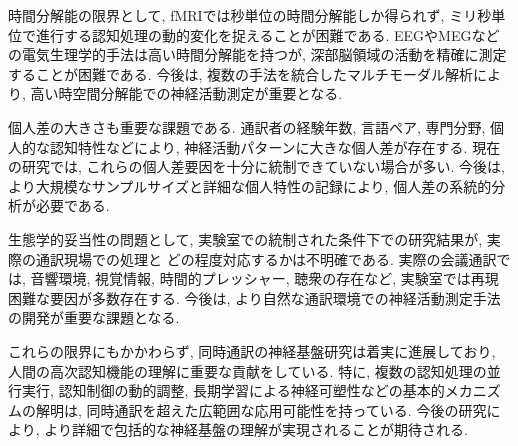 時間分解能の限界として, fMRIでは秒単位の時間分解能しか得られず, ミリ秒単位で進行する認知処理の動的変化を捉えることが困難である.
EEGやMEGなどの電気生理学的手法は高い時間分解能を持つが, 深部脳領域の活動を精確に測定することが困難である.
今後は, 複数の手法を統合したマルチモーダル解析により, 高い時空間分解能での神経活動測定が重要となる.

個人差の大きさも重要な課題である.
通訳者の経験年数, 言語ペア, 専門分野, 個人的な認知特性などにより, 神経活動パターンに大きな個人差が存在する.
現在の研究では, これらの個人差要因を十分に統制できていない場合が多い.
今後は, より大規模なサンプルサイズと詳細な個人特性の記録により, 個人差の系統的分析が必要である.

生態学的妥当性の問題として, 実験室での統制された条件下での研究結果が, 実際の通訳現場での処理と どの程度対応するかは不明確である.
実際の会議通訳では, 音響環境, 視覚情報, 時間的プレッシャー, 聴衆の存在など, 実験室では再現困難な要因が多数存在する.
今後は, より自然な通訳環境での神経活動測定手法の開発が重要な課題となる.

これらの限界にもかかわらず, 同時通訳の神経基盤研究は着実に進展しており, 人間の高次認知機能の理解に重要な貢献をしている.
特に, 複数の認知処理の並行実行, 認知制御の動的調整, 長期学習による神経可塑性などの基本的メカニズムの解明は, 同時通訳を超えた広範囲な応用可能性を持っている.
今後の研究により, より詳細で包括的な神経基盤の理解が実現されることが期待される.